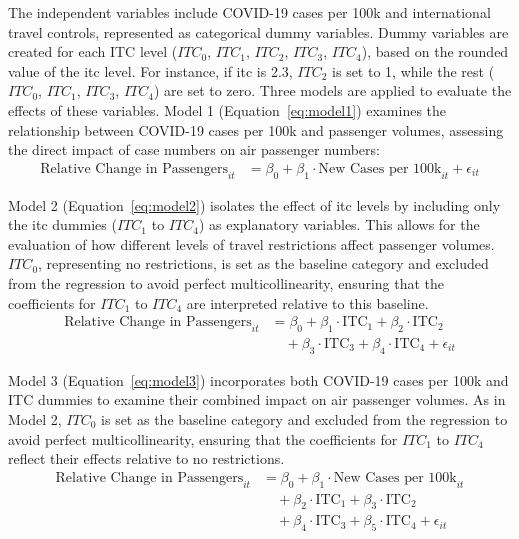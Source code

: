 \documentclass[12pt,onehalfspacing,headsepline,oneside,openright,a4paper, fleqn]{report}
\begin{document}
The independent variables include COVID-19 cases per 100k and international travel controls, represented as categorical dummy variables. Dummy variables are created for each ITC level ($ITC_0$, $ITC_1$, $ITC_2$, $ITC_3$, $ITC_4$), based on the rounded value of the \gls{itc} level. For instance, if \gls{itc} is 2.3, $ITC_2$ is set to 1, while the rest ($ITC_0$, $ITC_1$, $ITC_3$, $ITC_4$) are set to zero. 
Three models are applied to evaluate the effects of these variables. Model 1 (Equation~\ref{eq:model1}) examines the relationship between COVID-19 cases per 100k and passenger volumes, assessing the direct impact of case numbers on air passenger numbers:
\begin{equation}
\begin{aligned}
\text{Relative Change in Passengers}_{it} &= \beta_0 + \beta_1 \cdot \text{New Cases per 100k}_{it} + \epsilon_{it}
\end{aligned}
\label{eq:model1}
\end{equation}

Model 2 (Equation~\ref{eq:model2}) isolates the effect of \gls{itc} levels by including only the \gls{itc} dummies ($ITC_1$  to  $ITC_4$) as explanatory variables. This allows for the evaluation of how different levels of travel restrictions affect passenger volumes.  $ITC_0$, representing no restrictions, is set as the baseline category and excluded from the regression to avoid perfect multicollinearity, ensuring that the coefficients for $ITC_1$ to $ITC_4$ are interpreted relative to this baseline.
\begin{equation}
\begin{aligned}
\text{Relative Change in Passengers}_{it} &= \beta_0 + \beta_1 \cdot \text{ITC}_1 + \beta_2 \cdot \text{ITC}_2 \\
&\quad + \beta_3 \cdot \text{ITC}_3 + \beta_4 \cdot \text{ITC}_4 + \epsilon_{it}
\end{aligned}
\label{eq:model2}
\end{equation}

Model 3 (Equation~\ref{eq:model3}) incorporates both COVID-19 cases per 100k and ITC dummies to examine their combined impact on air passenger volumes. As in Model 2,  $ITC_0$  is set as the baseline category and excluded from the regression to avoid perfect multicollinearity, ensuring that the coefficients for $ITC_1$ to $ITC_4$ reflect their effects relative to no restrictions.
\begin{equation}
\begin{aligned}
\text{Relative Change in Passengers}_{it} &= \beta_0 + \beta_1 \cdot \text{New Cases per 100k}_{it} \\
&\quad + \beta_2 \cdot \text{ITC}_1 + \beta_3 \cdot \text{ITC}_2 \\
&\quad + \beta_4 \cdot \text{ITC}_3 + \beta_5 \cdot \text{ITC}_4 + \epsilon_{it}
\end{aligned}
\label{eq:model3}
\end{equation}	
\end{document}
